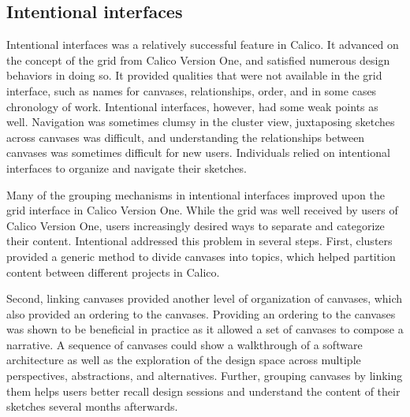 %
		
\subsection{Intentional interfaces}

Intentional interfaces was a relatively successful feature in Calico. It advanced on the concept of the grid from Calico Version One, and satisfied numerous design behaviors in doing so. It provided qualities that were not available in the grid interface, such as names for canvases, relationships, order, and in some cases chronology of work. Intentional interfaces, however, had some weak points as well. Navigation was sometimes clumsy in the cluster view, juxtaposing sketches across canvases was difficult, and understanding the relationships between canvases was sometimes difficult for new users. Individuals relied on intentional interfaces to organize and navigate their sketches.

Many of the grouping mechanisms in intentional interfaces improved upon the grid interface in Calico Version One. While the grid was well received by users of Calico Version One, users increasingly desired ways to separate and categorize their content. Intentional addressed this problem in several steps. First, clusters provided a generic method to divide canvases into topics, which helped partition content between different projects in Calico.

Second, linking canvases provided another level of organization of canvases, which also provided an ordering to the canvases. Providing an ordering to the canvases was shown to be beneficial in practice as it allowed a set of canvases to compose a narrative. A sequence of canvases could show a walkthrough of a software architecture as well as the exploration of the design space across multiple perspectives, abstractions, and alternatives. Further, grouping canvases by linking them helps users better recall design sessions and understand the content of their sketches several months afterwards.

